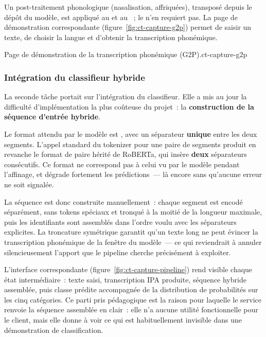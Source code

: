Un post-traitement phonologique (nasalisation, affriquées), transposé depuis le dépôt
du modèle, est appliqué au  et au ~; le
 n'en requiert pas. La page de démonstration correspondante
(figure~\ref{fig:ct-capture-g2p}) permet de saisir un texte, de choisir la langue et
d'obtenir la transcription phonémique.

{Page de démonstration de la transcription phonémique (G2P).}{ct-capture-g2p}

\subsubsection{Intégration du classifieur hybride}
\label{ssec:ct-classifieur}

La seconde tâche portait sur l'intégration du classifieur. Elle a mis au jour la
difficulté d'implémentation la plus coûteuse du projet~: la \textbf{construction de la
séquence d'entrée hybride}.

Le format attendu par le modèle est , avec un
séparateur \textbf{unique} entre les deux segments. L'appel standard du tokenizer pour
une paire de segments produit en revanche le format de paire hérité de RoBERTa, qui
insère \textbf{deux} séparateurs consécutifs. Ce format ne correspond pas à celui vu
par le modèle pendant l'affinage, et dégrade fortement les prédictions~--- là encore
sans qu'aucune erreur ne soit signalée.

La séquence est donc construite manuellement~: chaque segment est encodé séparément,
sans tokens spéciaux et tronqué à la moitié de la longueur maximale, puis les
identifiants sont assemblés dans l'ordre voulu avec les séparateurs explicites. La
troncature symétrique garantit qu'un texte long ne peut évincer la transcription
phonémique de la fenêtre du modèle~--- ce qui reviendrait à annuler silencieusement
l'apport que le pipeline cherche précisément à exploiter.

L'interface correspondante (figure~\ref{fig:ct-capture-pipeline}) rend visible chaque
état intermédiaire~: texte saisi, transcription IPA produite, séquence hybride
assemblée, puis classe prédite accompagnée de la distribution de probabilités sur les
cinq catégories. Ce parti pris pédagogique est la raison pour laquelle le service
renvoie la séquence assemblée en clair~: elle n'a aucune utilité fonctionnelle pour le
client, mais elle donne à voir ce qui est habituellement invisible dans une
démonstration de classification.

